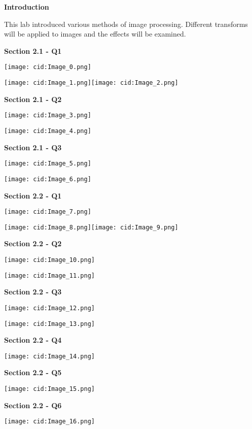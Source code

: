 \documentclass[
]{article}
\date{}
\begin{document}
\textbf{Introduction}

This lab introduced various methods of image processing. Different
transforms will be applied to images and the effects will be examined.

\textbf{Section 2.1 - Q1}

\texttt{[image: cid:Image\_0.png]}

\texttt{[image: cid:Image\_1.png]}\texttt{[image: cid:Image\_2.png]}

\textbf{Section 2.1 - Q2}

\texttt{[image: cid:Image\_3.png]}

\texttt{[image: cid:Image\_4.png]}

\textbf{Section 2.1 - Q3}

\texttt{[image: cid:Image\_5.png]}

\texttt{[image: cid:Image\_6.png]}

\textbf{Section 2.2 - Q1}

\texttt{[image: cid:Image\_7.png]}

\texttt{[image: cid:Image\_8.png]}\texttt{[image: cid:Image\_9.png]}

\textbf{Section 2.2 - Q2}

\texttt{[image: cid:Image\_10.png]}

\texttt{[image: cid:Image\_11.png]}

\textbf{Section 2.2 - Q3}

\texttt{[image: cid:Image\_12.png]}

\texttt{[image: cid:Image\_13.png]}

\textbf{Section 2.2 - Q4}

\texttt{[image: cid:Image\_14.png]}

\textbf{Section 2.2 - Q5}

\texttt{[image: cid:Image\_15.png]}

\textbf{Section 2.2 - Q6}

\texttt{[image: cid:Image\_16.png]}
\end{document}
